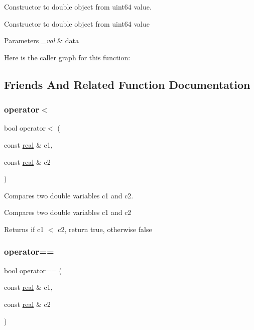 Constructor to double object from uint64 value. 

Constructor to double object from uint64 value 
\begin{DoxyParams}{Parameters}
{\em \+\_\+val} & data \\
\hline
\end{DoxyParams}
Here is the caller graph for this function\+:


\subsection{Friends And Related Function Documentation}
\mbox{\label{classaacio_1_1real_af2fed6b34d60d75b613ab1d3078d102c}} 
\subsubsection{\texorpdfstring{operator$<$}{operator<}}
{\footnotesize\ttfamily bool operator$<$ (\begin{DoxyParamCaption}\item[{const \mbox{\hyperlink{classaacio_1_1real}{real}} \&}]{c1,  }\item[{const \mbox{\hyperlink{classaacio_1_1real}{real}} \&}]{c2 }\end{DoxyParamCaption})\hspace{0.3cm}{\ttfamily [friend]}}



Compares two double variables c1 and c2. 

Compares two double variables c1 and c2 \begin{DoxyReturn}{Returns}
if c1 $<$ c2, return true, otherwise false 
\end{DoxyReturn}
\mbox{\label{classaacio_1_1real_a5a7c02baf325d5f9351d3e348f779f5a}} 
\subsubsection{\texorpdfstring{operator==}{operator==}}
{\footnotesize\ttfamily bool operator== (\begin{DoxyParamCaption}\item[{const \mbox{\hyperlink{classaacio_1_1real}{real}} \&}]{c1,  }\item[{const \mbox{\hyperlink{classaacio_1_1real}{real}} \&}]{c2 }\end{DoxyParamCaption})\hspace{0.3cm}{\ttfamily [friend]}}



